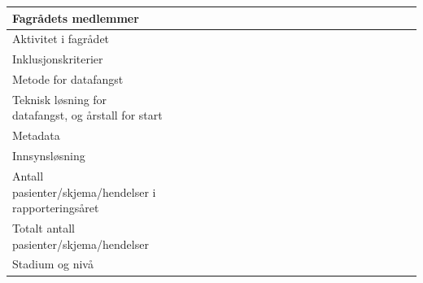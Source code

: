 \documentclass{article}
\begin{document}
\begin{center}
\begin{longtable}{| p{0.4\linewidth} | p{0.6\linewidth} |}
            \\ \hline
            Fagrådets medlemmer &
            
            \\ \hline
            Aktivitet i fagrådet &
            
            \\ \hline
            Inklusjonskriterier &
            
            \\ \hline
            Metode for datafangst &
            
            \\ \hline
            Teknisk løsning for datafangst, og årstall for start &
            
            \\ \hline
            Metadata &
            
            \\ \hline
            Innsynsløsning &
            
            \\ \hline
            Antall pasienter/skjema/hendelser i rapporteringsåret &
            
            \\ \hline
            Totalt antall pasienter/skjema/hendelser &
            
            \\ \hline
            Stadium og nivå &
            
            \\ \hline
         \end{longtable}
    \end{center}
    
\end{document}
